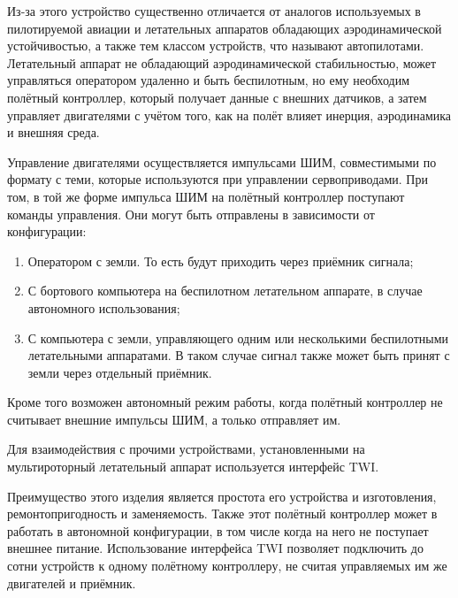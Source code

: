 Из-за этого устройство существенно отличается от аналогов
используемых в пилотируемой авиации и летательных аппаратов обладающих
аэродинамической устойчивостью, а также тем классом устройств, что называют
автопилотами. Летательный аппарат не обладающий аэродинамической
стабильностью, может управляться оператором удаленно и быть
беспилотным, но ему необходим полётный контроллер, который получает
данные с внешних датчиков, а затем управляет двигателями с учётом
того, как на полёт влияет инерция, аэродинамика и внешняя среда.


Управление двигателями осуществляется импульсами ШИМ, совместимыми по
формату с теми, которые используются при управлении
сервоприводами. При том, в той же форме импульса ШИМ на полётный
контроллер поступают команды управления.  Они могут быть отправлены в
зависимости от конфигурации:
\begin{enumerate}
\item Оператором с земли. То есть будут приходить через приёмник сигнала;
\item С бортового компьютера на беспилотном летательном аппарате, в случае автономного использования;
\item С компьютера с земли, управляющего одним или несколькими
беспилотными летательными аппаратами. В таком случае сигнал также
может быть принят с земли через отдельный приёмник.
\end{enumerate}
Кроме того возможен автономный режим работы, когда полётный контроллер
не считывает внешние импульсы ШИМ, а только отправляет им.

Для взаимодействия с прочими устройствами, установленными на
мультироторный летательный аппарат используется интерфейс TWI.


Преимущество этого изделия является простота его устройства и
изготовления, ремонтопригодность и заменяемость.
Также этот полётный контроллер может в работать в автономной
конфигурации, в том числе когда на него не поступает внешнее питание.
Использование интерфейса TWI позволяет подключить до сотни
устройств к одному полётному контроллеру, не считая управляемых им же
двигателей и приёмник.



